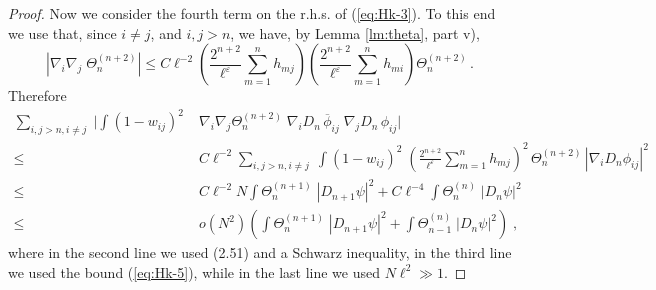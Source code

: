 \documentclass[11pt]{article}
\newcommand{\eps}{\varepsilon}
\begin{document}
\begin{proof}
Now we consider the fourth term on the r.h.s. of (\ref{eq:Hk-3}). To
this end we use that, since $i \neq j$, and $i,j
>n$, we have, by Lemma \ref{lm:theta}, part v),
\begin{equation}
\left| \nabla_i \nabla_j \; \Theta_n^{(n+2)} \right| \leq C
\ell^{-2} \left( \frac{2^{n+2}}{\ell^{\eps}} \sum_{m=1}^n h_{mj}
\right) \left( \frac{2^{n+2}}{\ell^{\eps}} \sum_{m=1}^n h_{mi}
\right) \Theta_n^{(n+2)}\,.
\end{equation}
Therefore
\begin{equation}\label{eq:Hk-7}
\begin{split}
\sum_{i,j > n, i\neq j} \; \Big| \int (1-w_{ij})^2 \; &\nabla_i
\nabla_j  \Theta^{(n+2)}_n  \; \nabla_i D_n
\,\overline{\phi}_{ij} \; \nabla_j D_n \, \phi_{ij}\Big| \\ \leq \;
&C \ell^{-2} \sum_{i,j > n, i\neq j} \; \int (1-w_{ij})^2 \; \left(
\frac{2^{n+2}}{\ell^{\eps}} \sum_{m=1}^n h_{mj} \right)^2 \,
\Theta^{(n+2)}_n \, |\nabla_i D_n \phi_{ij}|^2
\\ \leq \; &C \ell^{-2} N \int \Theta^{(n+1)}_n \; | D_{n+1} \psi|^2 + C
\ell^{-4} \int \Theta_n^{(n)} \; |D_n \psi|^2 \\
\leq \; & o(N^2) \left( \int \Theta^{(n+1)}_{n} \; | D_{n+1} \psi|^2
+ \int \Theta_{n-1}^{(n)} \; |D_n \psi|^2 \right)\; ,
\end{split}
\end{equation}
where in the second line we used (2.51) and a Schwarz inequality, in
the third line we used the bound (\ref{eq:Hk-5}), while in the last
line we used $N\ell^2 \gg 1$.

\medskip


\end{proof}
\end{document}
